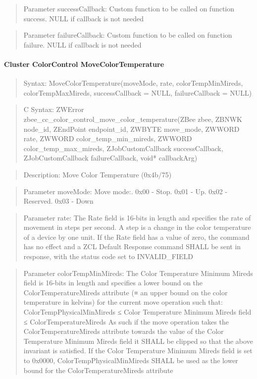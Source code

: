 \begin{quote}Parameter successCallback: Custom function to be called on function success. NULL if callback is not needed\end{quote}
\begin{quote}Parameter failureCallback: Custom function to be called on function failure. NULL if callback is not needed\end{quote}


\paragraph{Cluster ColorControl MoveColorTemperature}
\begin{quote}Syntax: MoveColorTemperature(moveMode, rate, colorTempMinMireds, colorTempMaxMireds, successCallback = NULL, failureCallback = NULL)\end{quote}
\begin{quote}C Syntax: ZWError zbee\_cc\_color\_control\_move\_color\_temperature(ZBee zbee, ZBNWK node\_id, ZEndPoint endpoint\_id, ZWBYTE move\_mode, ZWWORD rate, ZWWORD color\_temp\_min\_mireds, ZWWORD color\_temp\_max\_mireds, ZJobCustomCallback successCallback, ZJobCustomCallback failureCallback, void* callbackArg)\end{quote}
\begin{quote}Description: Move Color Temperature (0x4b/75)\end{quote}
\begin{quote}Parameter moveMode: Move mode:. 0x00 - Stop. 0x01 - Up. 0x02 - Reserved. 0x03 - Down\end{quote}
\begin{quote}Parameter rate: The Rate field is 16-bits in length and specifies the rate of movement in steps per second. A step is a change in the color temperature of a device by one unit. If the Rate field has a value of zero, the command has no effect and a ZCL Default Response command SHALL be sent in response, with the status code set to INVALID\_FIELD\end{quote}
\begin{quote}Parameter colorTempMinMireds: The Color Temperature Minimum Mireds field is 16-bits in length and specifies a lower bound on the ColorTemperatureMireds attribute (≡ an upper bound on the color temperature in kelvins) for the current move operation such that: ColorTempPhysicalMinMireds ≤ Color Temperature Minimum Mireds field ≤ ColorTemperatureMireds As such if the move operation takes the ColorTemperatureMireds attribute towards the value of the Color Temperature Minimum Mireds field it SHALL be clipped so that the above invariant is satisfied. If the Color Temperature Minimum Mireds field is set to 0x0000, ColorTempPhysicalMinMireds SHALL be used as the lower bound for the ColorTemperatureMireds attribute\end{quote}
